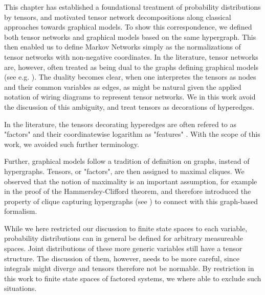
This chapter has established a foundational treatment of probability distributions by tensors, and motivated tensor network decompositions along classical approaches towards graphical models.
To show this correspondence, we defined both tensor networks and graphical models based on the same hypergraph.
This then enabled us to define Markov Networks simply as the normalizations of tensor networks with non-negative coordinates.
In the literature, tensor networks are, however, often treated as being dual to the graphs defining graphical models (see e.g. \cite{robeva_duality_2019}).
The duality becomes clear, when one interpretes the tensors as nodes and their common variables as edges, as might be natural given the applied notation of wiring diagrams to represent tensor networks.
We in this work avoid the discussion of this ambiguity, and treat tensors as decorations of hyperedges.

In the literature, the tensors decorating hyperedges are often refered to as "factors" and their coordinatewise logarithm as "features" \cite{koller_probabilistic_2009}.
With the scope of this work, we avoided such further terminology.

Further, graphical models follow a tradition of definition on graphs, instead of hypergraphs.
Tensors, or "factors", are then assigned to maximal cliques.
We observed that the notion of maximality is an important assumption, for example in the proof of the Hammersley-Clifford theorem, and therefore introduced the property of clique capturing hypergraphs (see ) to connect with this graph-based formalism.

While we here restricted our discussion to finite state spaces to each variable, probability distributions can in general be defined for arbitrary measureable spaces.
Joint distributions of these more generic variables still have a tensor structure.
The discussion of them, however, needs to be more careful, since integrals might diverge and tensors therefore not be normable.
By restriction in this work to finite state spaces of factored systems, we where able to exclude such situations.








